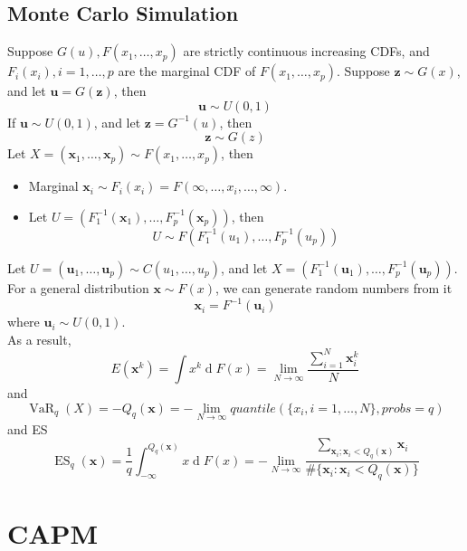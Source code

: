\documentclass[12pt]{article}
\theoremstyle{definition}
\DeclareMathOperator{\diff}{d}
\DeclareMathOperator{\VaR}{VaR}
\DeclareMathOperator{\ES}{ES}
\begin{document}
\subsection{Monte Carlo Simulation}
Suppose $G(u), F(x_1,\ldots, x_p)$ are strictly continuous increasing CDFs, and $F_i(x_i), i = 1,\ldots, p$ are the marginal CDF of $F(x_1,\ldots, x_p)$.
Suppose $\mathbf{z}\sim G(x)$, and let $\mathbf{u}=G(\mathbf{z})$, then
\[
\mathbf{u}\sim U(0,1)
\]
If $\mathbf{u}\sim U(0,1)$, and let $\mathbf{z}=G^{-1}(u)$, then
\[
\mathbf{z}\sim G(z)
\]
Let $X=(\mathbf{x}_1, \ldots, \mathbf{x}_p)\sim F(x_1,\ldots, x_p)$, then
\begin{itemize}
  \item Marginal $\mathbf{x}_i\sim F_i(x_i)=F(\infty, \ldots, x_i,\ldots, \infty)$.
  \item Let $U=(F_1^{-1}(\mathbf{x}_1),\ldots, F_p^{-1}(\mathbf{x}_p))$, then
  \[
U\sim F(F_1^{-1}(u_1),\ldots, F_p^{-1}(u_p))
  \]
\end{itemize}
Let $U=(\mathbf{u}_1, \ldots, \mathbf{u}_p)\sim C(u_1,\ldots, u_p)$, and let $X=(F_1^{-1}(\mathbf{u}_1), \ldots, F_p^{-1}(\mathbf{u}_p))$.\\
For a general distribution $\mathbf{x}\sim F(x)$, we can generate random numbers from it
\[
\mathbf{x}_i = F^{-1}(\mathbf{u}_i)
\]
where $\mathbf{u}_i\sim U(0,1)$.\\
As a result, 
\[
E(\mathbf{x}^k)=\int x^k\diff F(x) = \lim_{N\to \infty}\frac{\sum_{i=1}^N \mathbf{x}_i^k}{N}
\]
and
\[
\VaR_q(X)=-Q_q(\mathbf{x})=-\lim_{N\to\infty} \textit{quantile}(\{x_i, i = 1, \ldots, N\}, \textit{probs} = q)
\]
and ES
\[
\ES_q(\mathbf{x})= \frac{1}{q}\int_{-\infty}^{Q_q(\mathbf{x})}x\diff F(x)=-\lim_{N\to\infty}\frac{\sum_{\mathbf{x}_i; \mathbf{x}_i < Q_q(\mathbf{x})}\mathbf{x}_i}{\#\{\mathbf{x}_i:\mathbf{x}_i< Q_q(\mathbf{x})\}}
\]
\clearpage
\section{CAPM}
\end{document}
